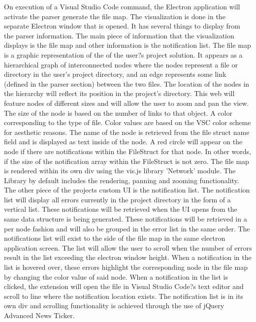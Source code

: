 \documentclass[letterpaper,10pt,titlepage,draftclsnofoot,onecolumn,onesided] {IEEEtran}
\begin{document}
On execution of a Visual Studio Code command, the Electron application will activate the parser generate the file map. 
The visualization is done in the separate Electron window that is opened.
It has several things to display from the parser information. 
The main piece of information that the visualization displays is the file map and other information is the notification list. 
The file map is a graphic representation of the of the user?s project solution. 
It appears as a hierarchical graph of interconnected nodes where the nodes represent a file or directory in the user's project directory, and an edge represents some link (defined in the parser section) between the two files. 
The location of the nodes in the hierarchy will reflect its position in the project's directory. 
This web will feature nodes of different sizes and will allow the user to zoom and pan the view. 
The size of the node is based on the number of links to that object.
A color corresponding to the type of file. 
Color values are based on the VSC color scheme for aesthetic reasons.
The name of the node is retrieved from the file struct name field and is displayed as text inside of the node. 
A red circle will appear on the node if there are notifications within the FileStruct for that node. 
In other words, if the size of the notification array within the FileStruct is not zero. 
The file map is rendered within its own div using the vis.js library 'Network' module. 
The Library by default includes the rendering, panning and zooming functionality.
The other piece of the projects custom UI is the notification list. 
The notification list will display all errors currently in the project directory in the form of a vertical list. 
These notifications will be retrieved when the UI opens from the same data structure is being generated. 
These notifications will be retrieved in a per node fashion and will also be grouped in the error list in the same order.
The notifications list will exist to the side of the file map in the same electron application screen. 
The list will allow the user to scroll when the number of errors result in the list exceeding the electron window height.
When a notification in the list is hovered over, these errors highlight the corresponding node in the file map by changing the color value of said node.
When a notification in the list is clicked, the extension will open the file in Visual Studio Code?s text editor and scroll to line where the notification location exists. 
The notification list is in its own div and scrolling functionality is achieved through the use of jQuery Advanced News Ticker. \\ %
\end{document}
